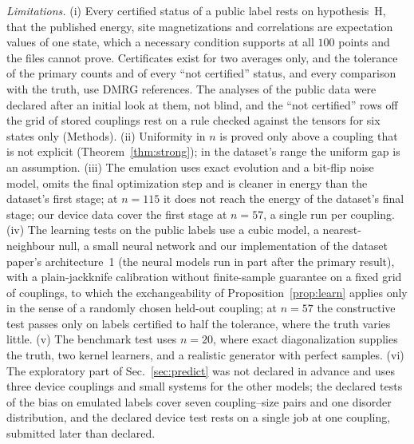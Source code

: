 \documentclass[aps,prx,twocolumn,10pt,superscriptaddress,nofootinbib,longbibliography,floatfix]{revtex4-2}
\theoremstyle{remark}
\begin{document}
\emph{Limitations.} (i) Every certified status of a public label rests on hypothesis~H, that the published energy,
site magnetizations and correlations are expectation values of one state, which a necessary condition supports at all $100$ points %
and the files cannot prove. Certificates exist for two averages only, and the tolerance of the primary counts and of
every ``not certified'' status, and every comparison with the truth, use DMRG references. The analyses of the public data were declared after
an initial look at them, not blind, and the ``not certified'' rows off the grid of stored couplings rest on a rule
checked against the tensors for six states only (Methods). (ii) Uniformity in $n$ is proved only above a coupling
that is not explicit (Theorem~\ref{thm:strong}); in the dataset's range the uniform gap is an assumption.
(iii) The emulation uses exact evolution and a bit-flip noise model, omits the final
optimization step and is cleaner in energy than the dataset's first stage; at $n=115$ it does not reach the energy
of the dataset's final stage; our device data cover the first stage %
at $n=57$, a single run per coupling. (iv) The learning tests on the public labels use a cubic model, a %
nearest-neighbour null, a small neural network and our implementation of the dataset paper's architecture~1 (the %
neural models run in part after the primary result), with a
plain-jackknife calibration without finite-sample guarantee on a fixed grid of couplings, to which the exchangeability
of Proposition~\ref{prop:learn} applies only in the sense of a randomly chosen held-out coupling; at $n=57$ the %
constructive test passes only on labels certified to half the tolerance, where the truth varies little.
(v) The benchmark
test uses $n=20$, where exact diagonalization supplies the truth, two kernel learners, and a realistic generator %
with perfect samples. (vi) The exploratory part
of Sec.~\ref{sec:predict} was not declared in advance and uses three device couplings and small systems for the other
models; the declared tests of the bias on emulated labels cover seven coupling--size pairs and one disorder
distribution,
and the declared device test rests on a single job at one coupling, submitted later than declared.
\end{document}
